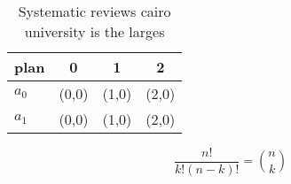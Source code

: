 \documentclass[a4paper]{article}
\begin{document}
\begin{table}
\begin{adjustbox}{width=0.6\columnwidth}
\begin{tabular}{|l|l|l|l|}
\hline
\textbf{plan} & \multicolumn{1}{c|}{\textbf{0}} & \multicolumn{1}{c|}{\textbf{1}} & \multicolumn{1}{c|}{\textbf{2}} \\ \hline
\textbf{$a_0$}  & (0,0) & (1,0) & (2,0) \\ \hline
\textbf{$a_1$}  & (0,0) & (1,0) & (2,0) \\ \hline
\end{tabular}
\end{adjustbox}
\caption{Systematic reviews cairo university is the larges
}
\end{table}

\[ \frac{n!}{k!(n-k)!} = \binom{n}{k} \]
\end{document}
